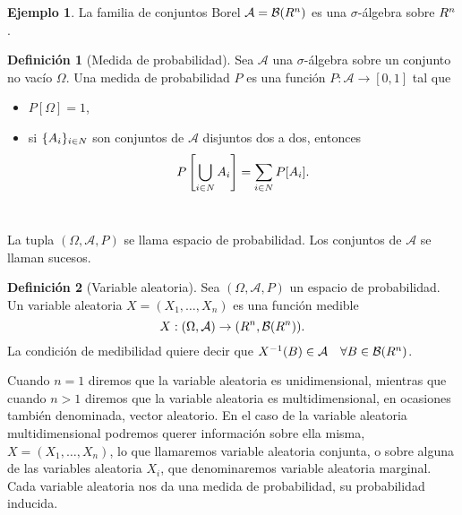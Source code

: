 \documentclass[12pt,a4paper]{report} %
\let\mathbb\relax
\theoremstyle{definition}
\newtheorem{definition}{Definición}[section]
\newtheorem{example}[theorem]{Ejemplo}
\begin{document}
\begin{example}
  La familia de conjuntos Borel $\mathcal{A} = \mathcal{B}(\mathbb{R}^n)$ es una $\sigma$-álgebra sobre $\mathbb{R}^n$.\\

\end{example}

\begin{definition}[Medida de probabilidad]
  Sea $\mathcal{A}$ una $\sigma$-álgebra sobre un conjunto no vacío $\Omega$. Una medida de probabilidad $P$ es una función $P:\mathcal{A} \to [0,1]$ tal que
  \begin{itemize}
  \item $P[\Omega] = 1$,
  \item si $\{A_i\}_{i\in \mathbb{N}}$  son conjuntos de $\mathcal{A}$ disjuntos dos a dos, entonces\[
    P\left[\bigcup_{i\in \mathbb{N}}A_i\right] = \sum_{i\in\mathbb{N}}P[A_i].\]\\[-10pt]
  \end{itemize}
\end{definition}

La tupla $(\Omega, \mathcal{A}, P)$ se llama espacio de probabilidad. Los conjuntos de $\mathcal{A}$ se llaman sucesos.\\

\begin{definition}[Variable aleatoria]
    Sea $(\Omega, \mathcal{A}, P)$ un espacio de probabilidad. Un variable aleatoria $X=(X_1,\dots, X_n)$ es una función medible \[
X:(\Omega, \mathcal{A}) \to (\mathbb{R}^n, \mathcal{B}(\mathbb{R}^n)).
\]
La condición de medibilidad quiere decir que $X^{-1}(B) \in \mathcal{A}\quad \forall B\in \mathcal{B}(\mathbb{R}^n)$.\\
\end{definition}

Cuando $n=1$ diremos que la variable aleatoria es unidimensional, mientras que cuando $n >1$ diremos que la variable aleatoria es multidimensional, en ocasiones también denominada, vector aleatorio. En el caso de la variable aleatoria multidimensional podremos querer información sobre ella misma, $X=(X_1,\dots, X_n)$, lo que llamaremos variable aleatoria conjunta, o sobre alguna de las variables aleatoria $X_i$, que denominaremos variable aleatoria marginal.\\

Cada variable aleatoria nos da una medida de probabilidad, su probabilidad inducida.\\
\end{document}
